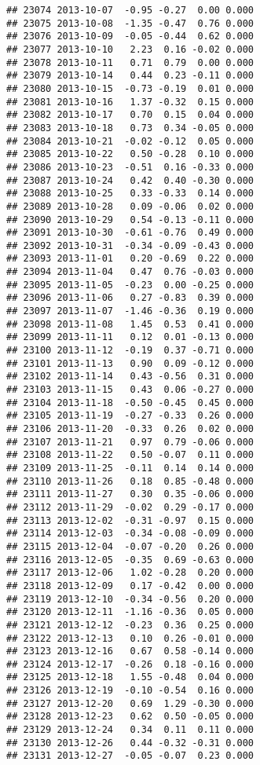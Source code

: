 \documentclass[
]{article}
\begin{document}
\begin{verbatim}
## 23074 2013-10-07  -0.95 -0.27  0.00 0.000
## 23075 2013-10-08  -1.35 -0.47  0.76 0.000
## 23076 2013-10-09  -0.05 -0.44  0.62 0.000
## 23077 2013-10-10   2.23  0.16 -0.02 0.000
## 23078 2013-10-11   0.71  0.79  0.00 0.000
## 23079 2013-10-14   0.44  0.23 -0.11 0.000
## 23080 2013-10-15  -0.73 -0.19  0.01 0.000
## 23081 2013-10-16   1.37 -0.32  0.15 0.000
## 23082 2013-10-17   0.70  0.15  0.04 0.000
## 23083 2013-10-18   0.73  0.34 -0.05 0.000
## 23084 2013-10-21  -0.02 -0.12  0.05 0.000
## 23085 2013-10-22   0.50 -0.28  0.10 0.000
## 23086 2013-10-23  -0.51  0.16 -0.33 0.000
## 23087 2013-10-24   0.42  0.40 -0.30 0.000
## 23088 2013-10-25   0.33 -0.33  0.14 0.000
## 23089 2013-10-28   0.09 -0.06  0.02 0.000
## 23090 2013-10-29   0.54 -0.13 -0.11 0.000
## 23091 2013-10-30  -0.61 -0.76  0.49 0.000
## 23092 2013-10-31  -0.34 -0.09 -0.43 0.000
## 23093 2013-11-01   0.20 -0.69  0.22 0.000
## 23094 2013-11-04   0.47  0.76 -0.03 0.000
## 23095 2013-11-05  -0.23  0.00 -0.25 0.000
## 23096 2013-11-06   0.27 -0.83  0.39 0.000
## 23097 2013-11-07  -1.46 -0.36  0.19 0.000
## 23098 2013-11-08   1.45  0.53  0.41 0.000
## 23099 2013-11-11   0.12  0.01 -0.13 0.000
## 23100 2013-11-12  -0.19  0.37 -0.71 0.000
## 23101 2013-11-13   0.90  0.09 -0.12 0.000
## 23102 2013-11-14   0.43 -0.56  0.31 0.000
## 23103 2013-11-15   0.43  0.06 -0.27 0.000
## 23104 2013-11-18  -0.50 -0.45  0.45 0.000
## 23105 2013-11-19  -0.27 -0.33  0.26 0.000
## 23106 2013-11-20  -0.33  0.26  0.02 0.000
## 23107 2013-11-21   0.97  0.79 -0.06 0.000
## 23108 2013-11-22   0.50 -0.07  0.11 0.000
## 23109 2013-11-25  -0.11  0.14  0.14 0.000
## 23110 2013-11-26   0.18  0.85 -0.48 0.000
## 23111 2013-11-27   0.30  0.35 -0.06 0.000
## 23112 2013-11-29  -0.02  0.29 -0.17 0.000
## 23113 2013-12-02  -0.31 -0.97  0.15 0.000
## 23114 2013-12-03  -0.34 -0.08 -0.09 0.000
## 23115 2013-12-04  -0.07 -0.20  0.26 0.000
## 23116 2013-12-05  -0.35  0.69 -0.63 0.000
## 23117 2013-12-06   1.02 -0.28  0.20 0.000
## 23118 2013-12-09   0.17 -0.42  0.00 0.000
## 23119 2013-12-10  -0.34 -0.56  0.20 0.000
## 23120 2013-12-11  -1.16 -0.36  0.05 0.000
## 23121 2013-12-12  -0.23  0.36  0.25 0.000
## 23122 2013-12-13   0.10  0.26 -0.01 0.000
## 23123 2013-12-16   0.67  0.58 -0.14 0.000
## 23124 2013-12-17  -0.26  0.18 -0.16 0.000
## 23125 2013-12-18   1.55 -0.48  0.04 0.000
## 23126 2013-12-19  -0.10 -0.54  0.16 0.000
## 23127 2013-12-20   0.69  1.29 -0.30 0.000
## 23128 2013-12-23   0.62  0.50 -0.05 0.000
## 23129 2013-12-24   0.34  0.11  0.11 0.000
## 23130 2013-12-26   0.44 -0.32 -0.31 0.000
## 23131 2013-12-27  -0.05 -0.07  0.23 0.000

\end{verbatim}
\end{document}
